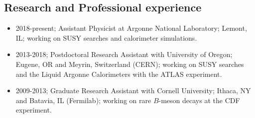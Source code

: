 \documentclass[letter, USenglish, 11pt, subfigure]{article}
\begin{document}
\subsection{Research and Professional experience}
\begin{itemize}
\item 2018-present; Assistant Physicist at Argonne National Laboratory; Lemont, IL; working on SUSY searches and calorimeter simulations.
\item 2013-2018; Postdoctoral Research Assistant with University of Oregon; Eugene, OR and Meyrin, Switzerland (CERN); working on SUSY searches and the Liquid Argonne Calorimeters with the ATLAS experiment.
\item 2009-2013; Graduate Research Assistant with Cornell University; Ithaca, NY and Batavia, IL (Fermilab); working on rare $B$-meson decays at the CDF experiment.
\end{itemize}

\end{document}
